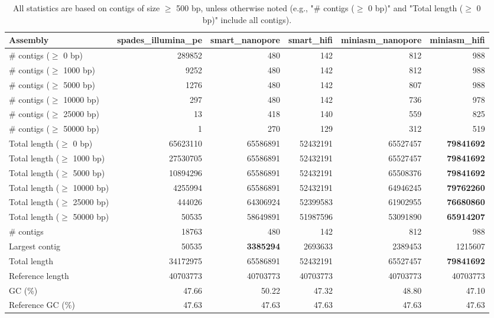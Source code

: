 \documentclass[12pt,a4paper]{article}
\begin{document}
\begin{table}[ht]
\begin{center}
\caption{All statistics are based on contigs of size $\geq$ 500 bp, unless otherwise noted (e.g., "\# contigs ($\geq$ 0 bp)" and "Total length ($\geq$ 0 bp)" include all contigs).}
\begin{tabular}{|l*{5}{|r}|}
\hline
Assembly & spades\_illumina\_pe & smart\_nanopore & smart\_hifi & miniasm\_nanopore & miniasm\_hifi \\ \hline
\# contigs ($\geq$ 0 bp) & 289852 & 480 & 142 & 812 & 988 \\ \hline
\# contigs ($\geq$ 1000 bp) & 9252 & 480 & 142 & 812 & 988 \\ \hline
\# contigs ($\geq$ 5000 bp) & 1276 & 480 & 142 & 807 & 988 \\ \hline
\# contigs ($\geq$ 10000 bp) & 297 & 480 & 142 & 736 & 978 \\ \hline
\# contigs ($\geq$ 25000 bp) & 13 & 418 & 140 & 559 & 825 \\ \hline
\# contigs ($\geq$ 50000 bp) & 1 & 270 & 129 & 312 & 519 \\ \hline
Total length ($\geq$ 0 bp) & 65623110 & 65586891 & 52432191 & 65527457 & {\bf 79841692} \\ \hline
Total length ($\geq$ 1000 bp) & 27530705 & 65586891 & 52432191 & 65527457 & {\bf 79841692} \\ \hline
Total length ($\geq$ 5000 bp) & 10894296 & 65586891 & 52432191 & 65508376 & {\bf 79841692} \\ \hline
Total length ($\geq$ 10000 bp) & 4255994 & 65586891 & 52432191 & 64946245 & {\bf 79762260} \\ \hline
Total length ($\geq$ 25000 bp) & 444026 & 64306924 & 52399583 & 61902955 & {\bf 76680860} \\ \hline
Total length ($\geq$ 50000 bp) & 50535 & 58649891 & 51987596 & 53091890 & {\bf 65914207} \\ \hline
\# contigs & 18763 & 480 & 142 & 812 & 988 \\ \hline
Largest contig & 50535 & {\bf 3385294} & 2693633 & 2389453 & 1215607 \\ \hline
Total length & 34172975 & 65586891 & 52432191 & 65527457 & {\bf 79841692} \\ \hline
Reference length & 40703773 & 40703773 & 40703773 & 40703773 & 40703773 \\ \hline
GC (\%) & 47.66 & 50.22 & 47.32 & 48.80 & 47.10 \\ \hline
Reference GC (\%) & 47.63 & 47.63 & 47.63 & 47.63 & 47.63 \\ \hline

\end{tabular}
\end{center}
\end{table}
\end{document}
